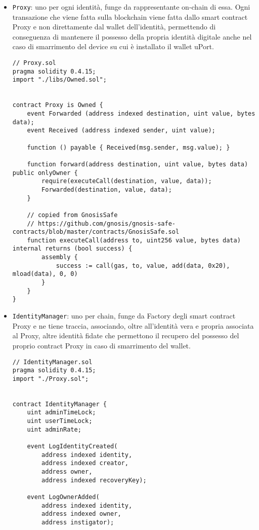 \begin{itemize}
  \item \texttt{Proxy}: uno per ogni identità, funge da rappresentante on-chain di essa. Ogni transazione che viene fatta
  sulla blockchain viene fatta dallo smart contract Proxy e non direttamente dal wallet dell’identità, permettendo
  di conseguenza di mantenere il possesso della propria identità digitale anche nel caso di smarrimento del 
  device su cui è installato il wallet uPort.

  \begin{lstlisting}[language=Solidity]
// Proxy.sol
pragma solidity 0.4.15;
import "./libs/Owned.sol";


contract Proxy is Owned {
    event Forwarded (address indexed destination, uint value, bytes data);
    event Received (address indexed sender, uint value);

    function () payable { Received(msg.sender, msg.value); }

    function forward(address destination, uint value, bytes data) public onlyOwner {
        require(executeCall(destination, value, data));
        Forwarded(destination, value, data);
    }

    // copied from GnosisSafe
    // https://github.com/gnosis/gnosis-safe-contracts/blob/master/contracts/GnosisSafe.sol
    function executeCall(address to, uint256 value, bytes data) internal returns (bool success) {
        assembly {
            success := call(gas, to, value, add(data, 0x20), mload(data), 0, 0)
        }
    }
}
  \end{lstlisting}
  \item \texttt{IdentityManager}: uno per chain, funge da Factory degli smart contract Proxy e ne tiene traccia,
  associando, oltre all’identità vera e propria associata al Proxy, altre identità fidate che permettono
  il recupero del possesso del proprio contract Proxy in caso di smarrimento del wallet.

  \begin{lstlisting}[language=Solidity]
// IdentityManager.sol
pragma solidity 0.4.15;
import "./Proxy.sol";


contract IdentityManager {
    uint adminTimeLock;
    uint userTimeLock;
    uint adminRate;

    event LogIdentityCreated(
        address indexed identity,
        address indexed creator,
        address owner,
        address indexed recoveryKey);

    event LogOwnerAdded(
        address indexed identity,
        address indexed owner,
        address instigator);


\end{lstlisting}
\end{itemize}
